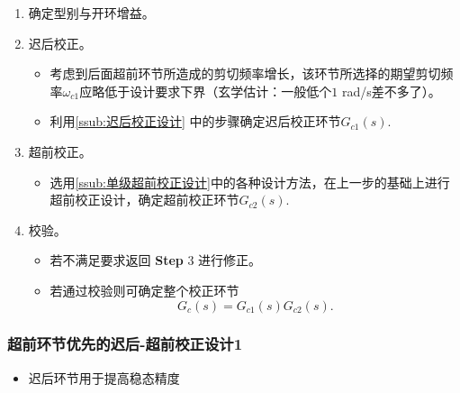 \documentclass[14pt,a4paper]{article}
\theoremstyle{plain}
\theoremstyle{definition}
\theoremstyle{remark}
\theoremstyle{plain}
\theoremstyle{plain}
\theoremstyle{plain}
\theoremstyle{definition}
\theoremstyle{remark}
\numberwithin{equation}{section}
\begin{document}
				\begin{enumerate}
					\item 确定型别与开环增益。
					\item 迟后校正。
						\begin{itemize}
							\item 考虑到后面超前环节所造成的剪切频率增长，该环节所选择的期望剪切频率$\omega_{c 1}$应略低于设计要求下界（玄学估计：一般低个$1$ rad/s差不多了）。
							\item 利用\ref{ssub:迟后校正设计} 中的步骤确定迟后校正环节$G_{c 1}(s)$. 
						\end{itemize} 
					\item 超前校正。
						\begin{itemize}
							\item 选用\ref{ssub:单级超前校正设计}中的各种设计方法，在上一步的基础上进行超前校正设计，确定超前校正环节$G_{c 2}(s)$. 
						\end{itemize}  
					\item 校验。
						\begin{itemize}
							\item 若不满足要求返回 \textbf{Step} 3 进行修正。
							\item 若通过校验则可确定整个校正环节
								\[
									G_{c}(s)=G_{c 1}(s) G_{c2}(s)
								.\] 
						\end{itemize}  
				\end{enumerate} 

			\subsubsection{超前环节优先的迟后-超前校正设计1}%
			\label{ssub:超前环节优先的迟后_超前校正设计1}
			
			\begin{itemize}
				\item 迟后环节用于提高稳态精度
			\end{itemize} 
\end{document}
